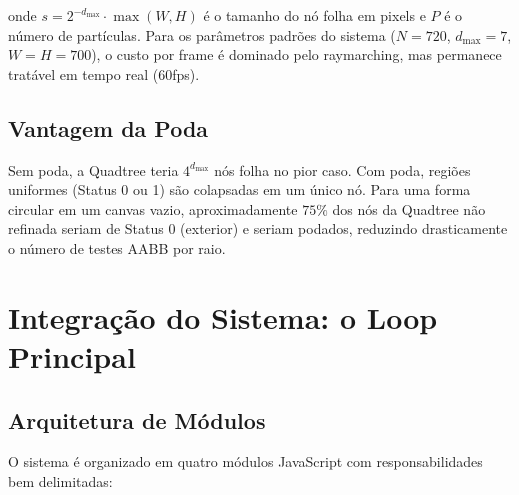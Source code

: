 \documentclass[11pt,a4paper]{article}
\theoremstyle{plain}
\theoremstyle{definition}
\begin{document}
onde $s = 2^{-d_{\max}} \cdot \max(W, H)$ é o tamanho do nó folha em pixels e
$P$ é o número de partículas. Para os parâmetros padrões do sistema
($N = 720$, $d_{\max} = 7$, $W = H = 700$), o custo por frame é dominado
pelo raymarching, mas permanece tratável em tempo real (60fps).

\subsection{Vantagem da Poda}

Sem poda, a Quadtree teria $4^{d_{\max}}$ nós folha no pior caso. Com poda,
regiões uniformes (Status 0 ou 1) são colapsadas em um único nó. Para uma forma
circular em um canvas vazio, aproximadamente $75\%$ dos nós da Quadtree não
refinada seriam de Status 0 (exterior) e seriam podados, reduzindo drasticamente
o número de testes AABB por raio.

\section{Integração do Sistema: o Loop Principal}
\label{sec:loop}

\subsection{Arquitetura de Módulos}

O sistema é organizado em quatro módulos JavaScript com responsabilidades bem
delimitadas:

\begin{center}
\end{center}
\end{document}

